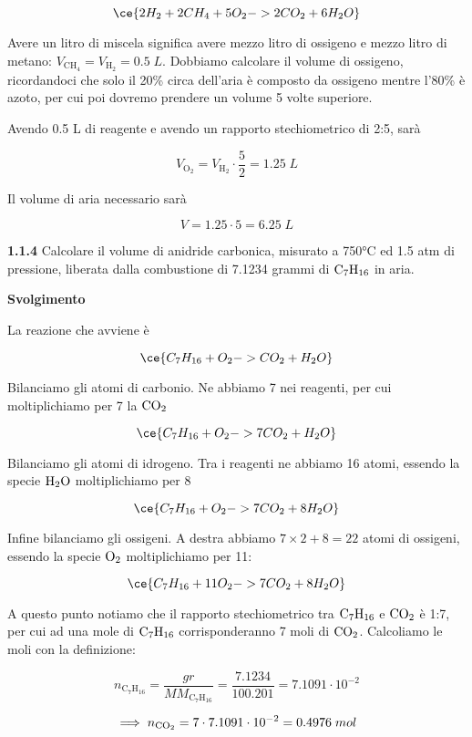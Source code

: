 $$\ce{2H_2 + 2CH_4 + 5O_2 -> 2CO_2 + 6H_2O}$$

Avere un litro di miscela significa avere mezzo litro di ossigeno e mezzo litro di metano: $V_{\text{CH}_4}=V_{\text{H}_2}=0.5\;L$. Dobbiamo calcolare il volume di ossigeno, ricordandoci che solo il 20\% circa dell'aria è composto da ossigeno mentre l'80\% è azoto, per cui poi dovremo prendere un volume 5 volte superiore.

Avendo 0.5 L di reagente e avendo un rapporto stechiometrico di 2:5, sarà

$$V_{\text{O}_2}=V_{\text{H}_2}\cdot\frac{5}{2}=1.25\;L$$

Il volume di aria necessario sarà

$$V=1.25 \cdot 5 = 6.25 \; L$$

\vspace{0.2cm}\textbf{1.1.4} Calcolare il volume di anidride carbonica, misurato a 750°C ed 1.5 atm di pressione, liberata dalla combustione di 7.1234 grammi di $\rm C_7H_{16}$ in aria.

\vspace{0.2cm}\large\textbf{Svolgimento}\normalsize

\vspace{0.2cm}La reazione che avviene è

$$\ce{C_7H_{16} + O_2 -> CO_2 + H_2O}$$

Bilanciamo gli atomi di carbonio. Ne abbiamo 7 nei reagenti, per cui moltiplichiamo per 7 la $\rm CO_2$

$$\ce{C_7H_{16} + O_2 -> 7CO_2 + H_2O}$$

Bilanciamo gli atomi di idrogeno. Tra i reagenti ne abbiamo 16 atomi, essendo la specie $\rm H_2O$ moltiplichiamo per 8

$$\ce{C_7H_{16} + O_2 -> 7CO_2 + 8H_2O}$$

Infine bilanciamo gli ossigeni. A destra abbiamo $7 \times 2 + 8=22$ atomi di ossigeni, essendo la specie $\rm O_2$ moltiplichiamo per 11:

$$\ce{C_7H_{16} + 11O_2 -> 7CO_2 + 8H_2O}$$

A questo punto notiamo che il rapporto stechiometrico tra $\rm C_7H_{16}$ e $\rm CO_2$ è 1:7, per cui ad una mole di $\rm C_7H_{16}$ corrisponderanno 7 moli di $\rm CO_2$. Calcoliamo le moli con la definizione:

$$n_{\text{C}_7\text{H}_{16}}=\frac{gr}{MM_{\text{C}_7\text{H}_{16}}}
=\frac{7.1234}{100.201}=7.1091 \cdot 10^{-2}$$

$$\implies
n_{\rm CO_2}
=7 \cdot 7.1091 \cdot 10^{-2}=0.4976\;mol$$

